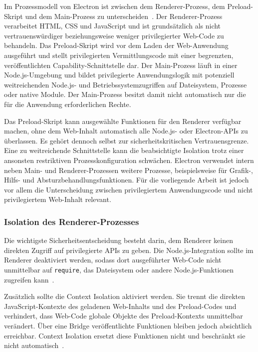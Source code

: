 Im Prozessmodell von Electron ist zwischen dem Renderer-Prozess, dem Preload-Skript und dem Main-Prozess zu unterscheiden~\cite{electron2026process}.
Der Renderer-Prozess verarbeitet HTML, CSS und JavaScript und ist grundsätzlich als nicht vertrauenswürdiger beziehungsweise weniger privilegierter Web-Code zu behandeln.
Das Preload-Skript wird vor dem Laden der Web-Anwendung ausgeführt und stellt privilegierten Vermittlungscode mit einer begrenzten, veröffentlichten Capability-Schnittstelle dar.
Der Main-Prozess läuft in einer Node.js-Umgebung und bildet privilegierte Anwendungslogik mit potenziell weitreichenden Node.js- und Betriebssystemzugriffen auf Dateisystem, Prozesse oder native Module.
Der Main-Prozess besitzt damit nicht automatisch nur die für die Anwendung erforderlichen Rechte.

Das Preload-Skript kann ausgewählte Funktionen für den Renderer verfügbar machen, ohne dem Web-Inhalt automatisch alle Node.js- oder Electron-APIs zu überlassen.
Es gehört dennoch selbst zur sicherheitskritischen Vertrauensgrenze.
Eine zu weitreichende Schnittstelle kann die beabsichtigte Isolation trotz einer ansonsten restriktiven Prozesskonfiguration schwächen.
Electron verwendet intern neben Main- und Renderer-Prozessen weitere Prozesse, beispielsweise für Grafik-, Hilfs- und Absturzbehandlungsfunktionen.
Für die vorliegende Arbeit ist jedoch vor allem die Unterscheidung zwischen privilegiertem Anwendungscode und nicht privilegiertem Web-Inhalt relevant.

\subsubsection{Isolation des Renderer-Prozesses}
Die wichtigste Sicherheitsentscheidung besteht darin, dem Renderer keinen direkten Zugriff auf privilegierte APIs zu geben.
Die Node.js-Integration sollte im Renderer deaktiviert werden, sodass dort ausgeführter Web-Code nicht unmittelbar auf \texttt{require}, das Dateisystem oder andere Node.js-Funktionen zugreifen kann~\cite{electron2026security}.

Zusätzlich sollte die Context Isolation aktiviert werden.
Sie trennt die direkten JavaScript-Kontexte des geladenen Web-Inhalts und des Preload-Codes und verhindert, dass Web-Code globale Objekte des Preload-Kontexts unmittelbar verändert.
Über eine Bridge veröffentlichte Funktionen bleiben jedoch absichtlich erreichbar.
Context Isolation ersetzt diese Funktionen nicht und beschränkt sie nicht automatisch~\cite{electron2026context}.

